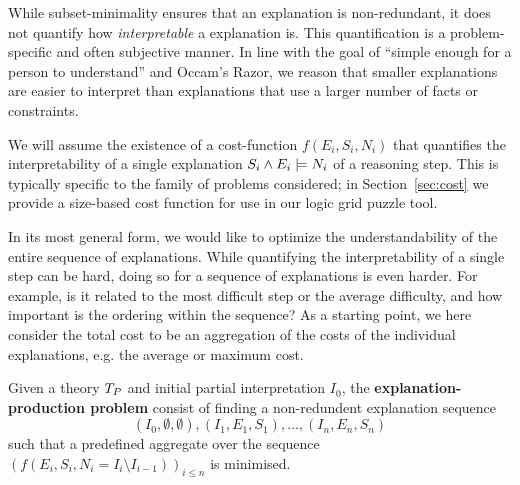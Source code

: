 While subset-minimality ensures that an explanation is non-redundant, it does not quantify how \textit{interpretable} a explanation is. 
This quantification is a problem-specific and often subjective manner. In line with the goal of ``simple enough for a person to understand'' and Occam's Razor, we reason that smaller explanations are easier to interpret than explanations that use a larger number of facts or constraints. %

We will assume the existence of a cost-function $f(E_i,S_i,N_i)$ that quantifies the interpretability of a single explanation $S_i \wedge E_i \models N_i$ of a reasoning step. 
This is typically specific to the family of problems considered; in Section~\ref{sec:cost} we provide a size-based cost function for use in our logic grid puzzle tool.

In its most general form, we would like to optimize the understandability of the entire sequence of explanations. 
While quantifying the interpretability of a single step can be hard, doing so for a sequence of explanations is even harder. For example, is it related to the most difficult step or the average difficulty, and how important is the ordering within the sequence?
As a starting point, we here consider the total cost to be an aggregation of the costs of the individual explanations, e.g. the average or maximum cost.

\begin{definition}
Given a theory $T_P$ and initial partial interpretation $I_0$, the \textbf{explanation-production problem} consist of finding a non-redundent explanation sequence
\[(I_0,\emptyset,\emptyset), (I_1,E_1,S_1), \dots ,(I_n,E_n,S_n)\]
such that a predefined aggregate over the sequence $\left(f(E_i,S_i,N_i=I_i\setminus I_{i-1})\right)_{i\leq n}$ is minimised.
\end{definition} 

